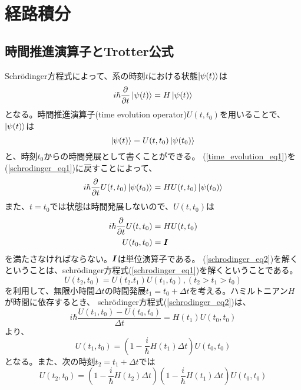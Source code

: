 
\section{経路積分}
\subsection{時間推進演算子とTrotter公式}
Schr\"{o}dinger方程式によって、系の時刻$t$における状態$\ket{\psi(t)}$は
\begin{equation}
  i\hbar \dfrac{\partial}{\partial t}\ket{\psi(t)} = H\ket{\psi(t)}
  \label{schrodinger_eq1}
\end{equation}
となる。時間推進演算子(time evolution operator)$U(t,t_0)$を用いることで、$\ket{\psi(t)}$は
\begin{equation}
  \ket{\psi(t)} = U(t,t_0)\ket{\psi(t_0)}
  \label{time_evolution_eq1}
\end{equation}
と、時刻$t_0$からの時間発展として書くことができる。
(\ref{time_evolution_eq1})を(\ref{schrodinger_eq1})に戻すことによって、
\begin{equation}
  i\hbar \dfrac{\partial}{\partial t}U(t,t_0)\ket{\psi(t_0)} = HU(t,t_0)\ket{\psi(t_0)}
\end{equation}
また、$t = t_0$では状態は時間発展しないので、$U(t,t_0)$は
\begin{align}
  i\hbar \dfrac{\partial}{\partial t}U(t,t_0) &= HU(t,t_0)\label{schrodinger_eq2}\\
  U(t_0,t_0) &= \mbox{\boldmath $I$} \label{U1}
\end{align}
を満たさなければならない。$\mbox{\boldmath $I$}$は単位演算子である。
(\ref{schrodinger_eq2})を解くということは、schr\"{o}dinger方程式(\ref{schrodinger_eq1})を解くということである。
\begin{equation}
  U(t_2,t_0) = U(t_2.t_1)U(t_1,t_0), (t_2>t_1>t_0)
\end{equation}
を利用して、無限小時間$\Delta t$の時間発展$t_1 = t_0 + \Delta t$を考える。ハミルトニアン$H$が時間に依存するとき、
schr\"{o}dinger方程式(\ref{schrodinger_eq2})は、
\begin{equation}
  i\hbar \dfrac{U(t_1,t_0) - U(t_0,t_0)}{\Delta t} = H(t_1)U(t_0,t_0)
\end{equation}
より、
\begin{equation}
  U(t_1,t_0) = \left(1 - \dfrac{i}{\hbar}H(t_1)\Delta t\right)U(t_0,t_0)
\end{equation}
となる。また、次の時刻$t_2 = t_1 + \Delta t$では
\begin{equation}
    U(t_2,t_0) = \left(1 - \dfrac{i}{\hbar}H(t_2)\Delta t\right)\left(1 - \dfrac{i}{\hbar}H(t_1)\Delta t\right)U(t_0,t_0)
\end{equation}
